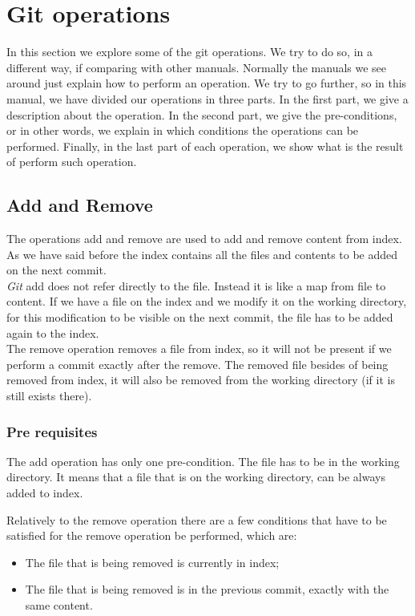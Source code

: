 \section{Git operations}
In this section we explore some of the git operations. We try to do
so, in a different way, if comparing with other manuals. Normally the
manuals we see around just explain how to perform an operation. We
try to go further, so in this manual, we have divided our operations in
three parts. In the first part, we give a description about the
operation. In the second part, we give the pre-conditions, or in other
words, we explain in which conditions the operations can be performed.
Finally, in the last part of each operation, we show what is the
result of perform such operation.

\subsection{Add and Remove}
The operations add and remove are used to add and remove content from
index. As we have said before the index contains all the files and
contents to be added on the next commit.\\

\emph{Git} add does not refer directly to the file. Instead it is like
a map from file to content. If we have a file on the index and we
modify it on the working directory, for this modification to be visible
on the next commit, the file has to be added again to the index.\\

The remove operation removes a file from index, so it will not be
present if we perform a commit exactly after the remove. The removed
file besides of being removed from index, it will also be removed from the 
working directory (if it is still exists there).

\subsubsection{Pre requisites}
The add operation has only one pre-condition. The file has to be in
the working directory. It means that a file that is
on the working directory, can be always added to index.

Relatively to the remove operation there are a few conditions that
have to be satisfied for the remove operation be performed, which are: 
\begin{itemize}
\item The file that is being removed is currently in index;
\item The file that is being removed is in the previous commit, exactly with the same
content.
\end{itemize}

